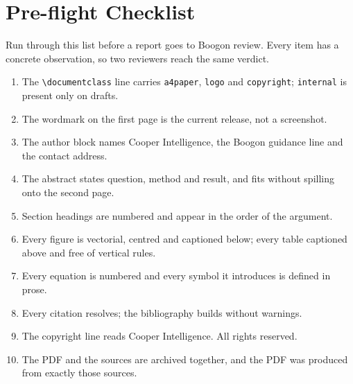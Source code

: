 \section{Pre-flight Checklist}
\label{app:checklist}

Run through this list before a report goes to Boogon review. Every item has a concrete
observation, so two reviewers reach the same verdict.

\begin{enumerate}
  \item The \verb|\documentclass| line carries \texttt{a4paper}, \texttt{logo} and
        \texttt{copyright}; \texttt{internal} is present only on drafts.
  \item The wordmark on the first page is the current release, not a screenshot.
  \item The author block names Cooper Intelligence, the Boogon guidance line and the contact
        address.
  \item The abstract states question, method and result, and fits without spilling onto the
        second page.
  \item Section headings are numbered and appear in the order of the argument.
  \item Every figure is vectorial, centred and captioned below; every table captioned above and
        free of vertical rules.
  \item Every equation is numbered and every symbol it introduces is defined in prose.
  \item Every citation resolves; the bibliography builds without warnings.
  \item The copyright line reads \textcopyright{} \the\year{} Cooper Intelligence. All rights
        reserved.
  \item The PDF and the sources are archived together, and the PDF was produced from exactly
        those sources.
\end{enumerate}
